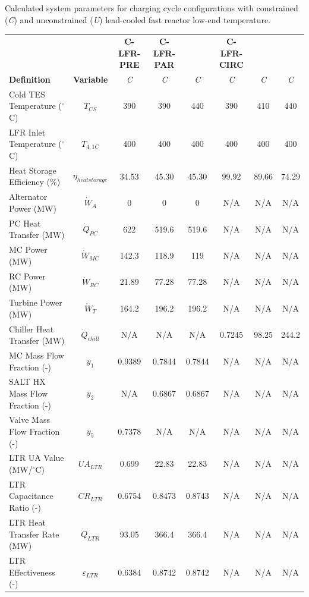 \begin{paracol}{2}
\begin{specialtable}[H] 
    \caption{Calculated system parameters for charging cycle configurations with constrained (\textit{C}) and unconstrained (\textit{U}) lead-cooled fast reactor low-end temperature.\label{tab-charg}}
    \begin{tabular}{lccccccc}
    \toprule
     &  & \textbf{C-LFR-PRE} & \textbf{C-LFR-PAR} &  &	\textbf{C-LFR-CIRC} &	& \\
    \textbf{Definition} & \textbf{Variable} & \textit{C} & \textit{C} & \textit{C} & \textit{C} &	\textit{C}	&	\textit{C}\\
    \midrule
    Cold TES Temperature ($^{\circ}$C)	&	$T_{CS}$	&	390	&	390	&	440	&	390	&	410	&	440	\\
    LFR Inlet Temperature ($^{\circ}$C)	&	$T_{4,1C}$	&	400	&	400	&	400	&	400	&	400	&	400	\\
    Heat Storage Efficiency (\%)	&	$\eta_{heatstorage}$	&	34.53	&	45.30	&	45.30	&	99.92	&	89.66	&	74.29	\\
    Alternator Power (MW)	&	$\dot{W}_{A}$	&	0	&	0	&	0	&	N/A	&	N/A	&	N/A	\\
    PC Heat Transfer (MW)	&	$\dot{Q}_{PC}$	&	622	&	519.6	&	519.6	&	N/A	&	N/A	&	N/A	\\
    MC Power (MW)	&	$\dot{W}_{MC}$	&	142.3	&	118.9	&	119	&	N/A	&	N/A	&	N/A	\\
    RC Power (MW)	&	$\dot{W}_{RC}$	&	21.89	&	77.28	&	77.28	&	N/A	&	N/A	&	N/A	\\
    Turbine Power (MW)	&	$\dot{W}_{T}$	&	164.2	&	196.2	&	196.2	&	N/A	&	N/A	&	N/A	\\
    Chiller Heat Transfer (MW)	&	$\dot{Q}_{chill}$	&	N/A	&	N/A	&	N/A	&	0.7245	&	98.25	&	244.2	\\
    MC Mass Flow Fraction (-)	&	$y_{1}$	&	0.9389	&	0.7844	&	0.7844	&	N/A	&	N/A	&	N/A	\\
    SALT HX Mass Flow Fraction (-)	&	$y_{2}$	&	N/A	&	0.6867	&	0.6867	&	N/A	&	N/A	&	N/A	\\
    Valve Mass Flow Fraction (-)	&	$y_{5}$	&	0.7378	&	N/A	&	N/A	&	N/A	&	N/A	&	N/A	\\
    LTR UA Value (MW/$^{\circ}$C)	&	$UA_{LTR}$	&	0.699	&	22.83	&	22.83	&	N/A	&	N/A	&	N/A	\\
    LTR Capacitance Ratio (-)	&	$CR_{LTR}$	&	0.6754	&	0.8473	&	0.8743	&	N/A	&	N/A	&	N/A	\\
    LTR Heat Transfer Rate (MW)	&	$\dot{Q}_{LTR}$	&	93.05	&	366.4	&	366.4	&	N/A	&	N/A	&	N/A	\\
    LTR Effectiveness (-)	&	$\varepsilon_{LTR}$	&	0.6384	&	0.8742	&	0.8742	&	N/A	&	N/A	&	N/A	\\

\end{tabular}
\end{specialtable}
\end{paracol}

